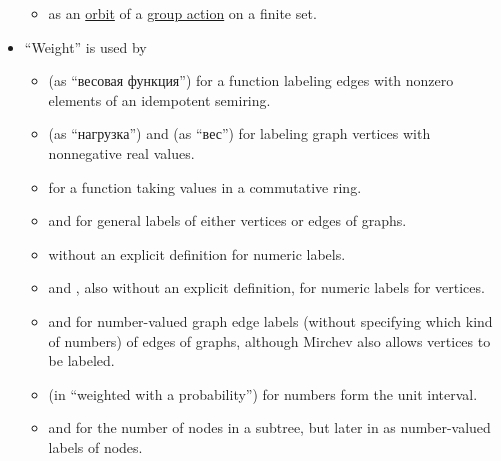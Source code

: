 \begin{remark}
\begin{itemize}
\begin{itemize}
      \item {} as an \hyperref[def:group_action_orbit]{orbit} of a \hyperref[def:group_action]{group action} on a finite set.
    \end{itemize}

    \item \enquote{Weight} is used by
    \begin{itemize}
      \item {} (as \enquote{весовая функция}) for a function labeling edges with nonzero elements of an idempotent semiring.

      \item {} (as \enquote{нагрузка}) and  (as \enquote{вес}) for labeling graph vertices with nonnegative real values.

      \item {} for a function taking values in a commutative ring.


      \item {} and  for general labels of either vertices or edges of graphs.

      \item {} without an explicit definition for numeric labels.

      \item {} and , also without an explicit definition, for numeric labels for vertices.

      \item {} and  for number-valued graph edge labels (without specifying which kind of numbers) of edges of graphs, although Mirchev also allows vertices to be labeled.

      \item {} (in \enquote{weighted with a probability}) for numbers form the unit interval.

      \item {} and  for the number of nodes in a subtree, but later in  as number-valued labels of nodes.


\end{itemize}
\end{itemize}
\end{remark}
